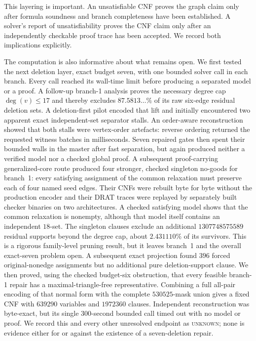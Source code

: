 This layering is important.  An unsatisfiable CNF proves the graph claim only
after formula soundness and branch completeness have been established.  A
solver's report of unsatisfiability proves the CNF claim only after an
independently checkable proof trace has been accepted.  We record both
implications explicitly.

The computation is also informative about what remains open.  We first tested
the next deletion layer, exact budget seven, with one bounded solver call in
each branch.  Every call reached its wall-time limit before producing a
separated model or a proof.  A follow-up branch-1 analysis proves the necessary
degree cap \(\deg(v)\le17\) and thereby excludes \(87.5813\ldots\%\) of its raw
six-edge residual deletion sets.  A deletion-first pilot encoded that lift and
initially encountered two apparent exact independent-set separator stalls.
An order-aware reconstruction showed that both stalls were vertex-order
artefacts: reverse ordering returned the requested witness batches in
milliseconds.  Seven repaired gates then spent their bounded walls in the
master after fast separation, but again produced neither a verified model nor
a checked global proof.  A subsequent proof-carrying generalized-core route
produced four stronger, checked singleton no-goods for branch~1: every
satisfying assignment of the common relaxation must preserve each of four
named seed edges.  Their CNFs were rebuilt byte for byte without the
production encoder and their DRAT traces were replayed by separately built
checker binaries on two architectures.  A checked satisfying model shows that
the common relaxation is nonempty, although that model itself contains an
independent \(18\)-set.  The singleton clauses exclude an additional
\(1307748575589\) residual supports beyond the degree cap, about
\(2.431110\%\) of its survivors.  This is a rigorous family-level pruning
result, but it leaves branch~1 and the overall exact-seven problem open.  A
subsequent exact projection found \(396\) forced original-nonedge assignments
but no additional pure deletion-support clause.  We then proved, using the
checked budget-six obstruction, that every feasible branch-1 repair has a
maximal-triangle-free representative.  Combining a full all-pair encoding of
that normal form with the complete \(530525\)-mask union gives a fixed CNF with
\(639290\) variables and \(1972360\) clauses.  Independent reconstruction was
byte-exact, but its single \(300\)-second bounded call timed out with no model
or proof.  We record this and every other unresolved endpoint as
\textsc{unknown}; none is evidence either for or against the existence of a
seven-deletion repair.


